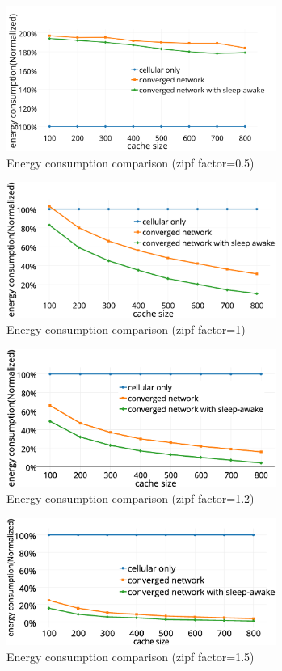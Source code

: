 \documentclass[conference]{IEEEtran}
\begin{document}
\begin{figure}[t]
\centering
\includegraphics[width=8.8cm]{figure/energy05.png}
 \caption{Energy consumption comparison (zipf factor=0.5)}
\label{Fig.ezf05}
\end{figure}

\begin{figure}[t]
\centering
\includegraphics[width=8.8cm]{figure/energy-zipf-factor=1.eps}
 \caption{Energy consumption comparison (zipf factor=1)}
\label{Fig.ezf1}
\end{figure}


\begin{figure}[t]
\centering
\includegraphics[width=8.8cm]{figure/energy-zipf-factor=12.eps}
 \caption{Energy consumption comparison (zipf factor=1.2)}
\label{Fig.ezf12}
\end{figure}

\begin{figure}[t]
\centering
\includegraphics[width=8.8cm]{figure/energy-zipf-factor=15.eps}
 \caption{Energy consumption comparison (zipf factor=1.5)}
\label{Fig.ezf15}
\end{figure}
\end{document}
